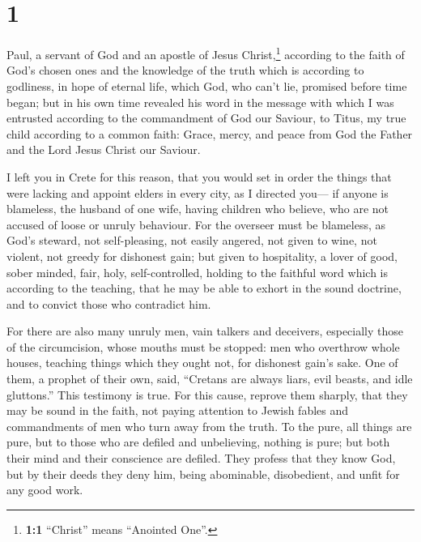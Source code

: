 \hypertarget{section}{%
\section{1}\label{section}}

 Paul, a servant of God and an apostle of Jesus
Christ,\footnote{\textbf{1:1} ``Christ'' means ``Anointed One''.}
according to the faith of God's chosen ones and the knowledge of the
truth which is according to godliness,  in hope of eternal
life, which God, who can't lie, promised before time began;
 but in his own time revealed his word in the message with
which I was entrusted according to the commandment of God our Saviour,
 to Titus, my true child according to a common faith:
Grace, mercy, and peace from God the Father and the Lord Jesus Christ
our Saviour.

 I left you in Crete for this reason, that you would set
in order the things that were lacking and appoint elders in every city,
as I directed you---  if anyone is blameless, the husband
of one wife, having children who believe, who are not accused of loose
or unruly behaviour.  For the overseer must be blameless,
as God's steward, not self-pleasing, not easily angered, not given to
wine, not violent, not greedy for dishonest gain;  but
given to hospitality, a lover of good, sober minded, fair, holy,
self-controlled,  holding to the faithful word which is
according to the teaching, that he may be able to exhort in the sound
doctrine, and to convict those who contradict him.

 For there are also many unruly men, vain talkers and
deceivers, especially those of the circumcision,  whose
mouths must be stopped: men who overthrow whole houses, teaching things
which they ought not, for dishonest gain's sake.  One of
them, a prophet of their own, said, ``Cretans are always liars, evil
beasts, and idle gluttons.''  This testimony is true. For
this cause, reprove them sharply, that they may be sound in the faith,
 not paying attention to Jewish fables and commandments
of men who turn away from the truth.  To the pure, all
things are pure, but to those who are defiled and unbelieving, nothing
is pure; but both their mind and their conscience are defiled.
 They profess that they know God, but by their deeds they
deny him, being abominable, disobedient, and unfit for any good work.

